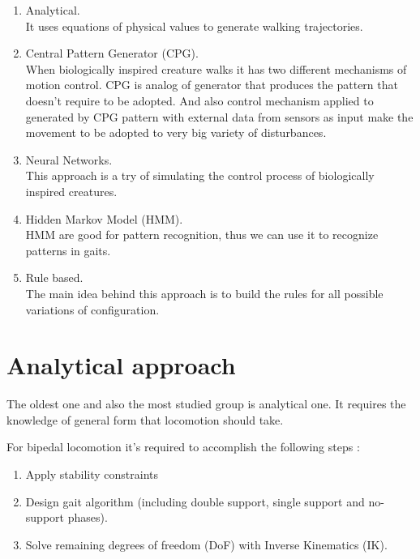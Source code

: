 \documentclass[12pt,a4paper]{report}
\begin{document}
		\begin{enumerate}
			\item Analytical.\\ It uses equations of physical values to generate walking trajectories.
			\item Central Pattern Generator (CPG).\\ When biologically inspired creature walks it has two different mechanisms of motion control. CPG is analog of generator that produces the pattern that doesn't require to be adopted. And also control mechanism applied to generated by CPG pattern with external data from sensors as input make the movement to be adopted to very big variety of disturbances.
			\item Neural Networks.\\ This approach is a try of simulating the control process of biologically inspired creatures.
			\item Hidden Markov Model (HMM).\\ HMM are good for pattern recognition, thus we can use it to recognize patterns in gaits.
			\item Rule based.\\ The main idea behind this approach is to build the rules for all possible variations of configuration.
		\end{enumerate}

		\section{Analytical approach}
		The oldest one and also the most studied group is analytical one. It requires the knowledge of general form that locomotion should take.

		For bipedal locomotion it's required to accomplish the following steps \cite{wright2014intelligent}:
		\begin{enumerate}
			\item Apply stability constraints
			\item Design gait algorithm (including double support, single support and no-support phases).
			\item Solve remaining degrees of freedom (DoF) with Inverse Kinematics (IK).
		\end{enumerate}
\end{document}
